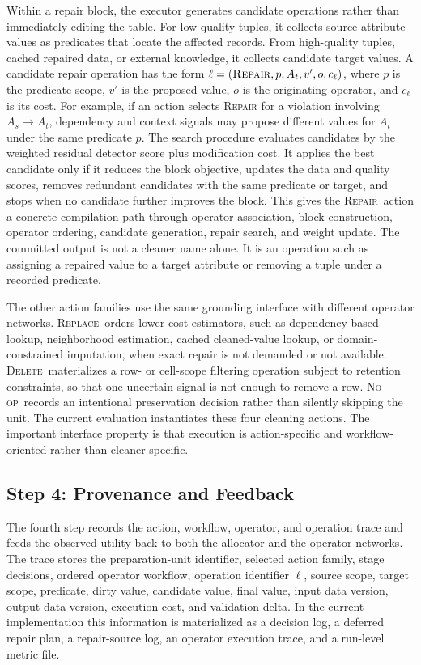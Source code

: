 \documentclass[sigconf, nonacm]{acmart}
\newcommand{\noop}{\textsc{No-op}\xspace}
\newcommand{\repair}{\textsc{Repair}\xspace}
\newcommand{\deleteop}{\textsc{Delete}\xspace}
\newcommand{\replaceop}{\textsc{Replace}\xspace}
\begin{document}
Within a repair block, the executor generates candidate operations rather than immediately editing the table. For low-quality tuples, it collects source-attribute values as predicates that locate the affected records. From high-quality tuples, cached repaired data, or external knowledge, it collects candidate target values. A candidate repair operation has the form $\ell=(\repair,p,A_t,v',o,c_\ell)$, where $p$ is the predicate scope, $v'$ is the proposed value, $o$ is the originating operator, and $c_\ell$ is its cost. For example, if an action selects \repair for a violation involving $A_s\rightarrow A_t$, dependency and context signals may propose different values for $A_t$ under the same predicate $p$. The search procedure evaluates candidates by the weighted residual detector score plus modification cost. It applies the best candidate only if it reduces the block objective, updates the data and quality scores, removes redundant candidates with the same predicate or target, and stops when no candidate further improves the block. This gives the \repair\ action a concrete compilation path through operator association, block construction, operator ordering, candidate generation, repair search, and weight update. The committed output is not a cleaner name alone. It is an operation such as assigning a repaired value to a target attribute or removing a tuple under a recorded predicate.

The other action families use the same grounding interface with different operator networks. \replaceop\ orders lower-cost estimators, such as dependency-based lookup, neighborhood estimation, cached cleaned-value lookup, or domain-constrained imputation, when exact repair is not demanded or not available. \deleteop\ materializes a row- or cell-scope filtering operation subject to retention constraints, so that one uncertain signal is not enough to remove a row. \noop\ records an intentional preservation decision rather than silently skipping the unit. The current evaluation instantiates these four cleaning actions. The important interface property is that execution is action-specific and workflow-oriented rather than cleaner-specific.

\subsection{Step 4: Provenance and Feedback}

The fourth step records the action, workflow, operator, and operation trace and feeds the observed utility back to both the allocator and the operator networks. The trace stores the preparation-unit identifier, selected action family, stage decisions, ordered operator workflow, operation identifier $\ell$, source scope, target scope, predicate, dirty value, candidate value, final value, input data version, output data version, execution cost, and validation delta. In the current implementation this information is materialized as a decision log, a deferred repair plan, a repair-source log, an operator execution trace, and a run-level metric file.
\end{document}
